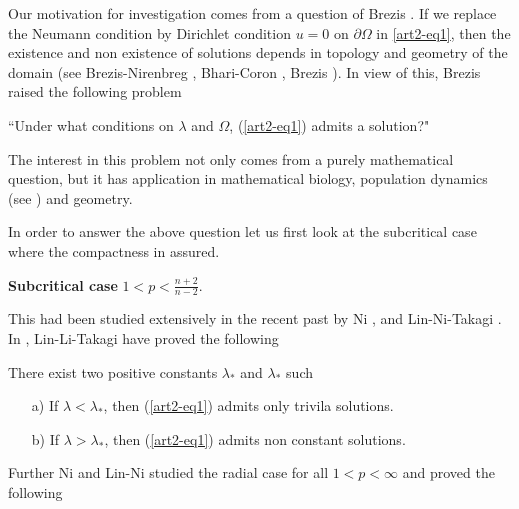 Our motivation for investigation comes from a question of Brezis \cite{art2-key11}. If we replace the Neumann condition by Dirichlet condition $u=0$ on $\partial\Omega$ in \ref{art2-eq1}, then the existence and non existence of solutions depends in topology and geometry of the domain (see Brezis-Nirenbreg \cite{art2-key14}, Bhari-Coron \cite{art2-key9}, Brezis \cite{art2-key10}). In view of this, Brezis raised the following problem

\begin{center}
``Under what conditions on $\lambda$ and $\Omega$, (\ref{art2-eq1}) admits a solution?"
\end{center}

The interest in this problem not only comes from a purely mathematical question, but it has application in mathematical biology, population dynamics (see \cite{art2-key16}) and geometry.

In order to answer the above question let us first look at the subcritical case where the compactness in assured.

\medskip
\noindent\textbf{Subcritical case }$1 < p < \frac{n+2}{n-2}$. 

\medskip
This had been studied extensively in the recent past by Ni \cite{art2-key18}, and Lin-Ni-Takagi \cite{art2-key16}. In \cite{art2-key16}, Lin-Li-Takagi have proved the following

\begin{theorem}\label{art2-thm1}
There exist two positive constants $\lambda_{*}$ and $\lambda_{*}$ such
\begin{itemize}
\item[a)] If $\lambda < \lambda_{*}$, then (\ref {art2-eq1}) admits only trivila solutions.
 \item[b)] If $\lambda > \lambda_{*}$, then (\ref {art2-eq1}) admits non constant solutions.
\end{itemize}

Further Ni \cite{art2-key18} and Lin-Ni \cite{art2-key15} studied the radial case for all $1< p < \infty$ and proved the following 
\end{theorem}


